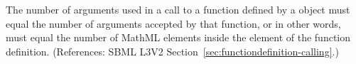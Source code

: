 The number of arguments used in a call to a function defined by a
\FunctionDefinition object must equal the number of arguments accepted by
that function, or in other words, must equal the number of MathML
 elements inside the  element of the function
definition.  (References: SBML L3V2
Section~\ref{sec:functiondefinition-calling}.)
